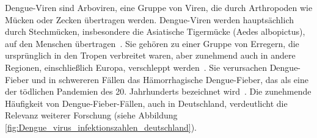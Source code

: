 \documentclass[german,version-2022-01]{uzl-thesis}
\begin{document}
Dengue-Viren sind Arboviren, eine Gruppe von Viren, die durch Arthropoden wie M\"ucken oder Zecken \"ubertragen werden. Dengue-Viren werden haupts\"achlich durch Stechm\"ucken, insbesondere die Asiatische Tigerm\"ucke (Aedes albopictus), auf den Menschen \"ubertragen~\cite{cramer_dengue-virus_2014}. Sie geh\"oren zu einer Gruppe von Erregern, die urspr\"unglich in den Tropen verbreitet waren, aber zunehmend auch in andere Regionen, einschlie\ss{}lich Europa, verschleppt werden~\cite{cramer_dengue-virus_2014}. Sie verursachen Dengue-Fieber und in schwereren F\"allen das H\"amorrhagische Dengue-Fieber, das als eine der t\"odlichen Pandemien des 20. Jahrhunderts bezeichnet wird~\cite{kuhnle_dengue-fieber_1999}. Die zunehmende H\"aufigkeit von Dengue-Fieber-F\"allen, auch in Deutschland, verdeutlicht die Relevanz weiterer Forschung (siehe Abbildung \ref{fig:Dengue_virus_infektionszahlen_deutschland}).
\end{document}
